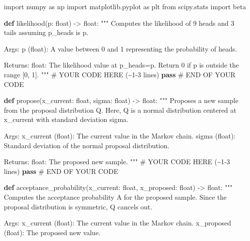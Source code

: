 \documentclass[
  letterpaper,
  numbers=noenddot,
  DIV=11,
  oneside]{scrreprt}
\newenvironment{Shaded}{\begin{snugshade}}{\end{snugshade}}
\newcommand{\BuiltInTok}[1]{\textcolor[rgb]{0.00,0.23,0.31}{#1}}
\newcommand{\CommentTok}[1]{\textcolor[rgb]{0.37,0.37,0.37}{#1}}
\newcommand{\ControlFlowTok}[1]{\textcolor[rgb]{0.00,0.23,0.31}{\textbf{#1}}}
\newcommand{\ImportTok}[1]{\textcolor[rgb]{0.00,0.46,0.62}{#1}}
\newcommand{\KeywordTok}[1]{\textcolor[rgb]{0.00,0.23,0.31}{\textbf{#1}}}
\newcommand{\NormalTok}[1]{\textcolor[rgb]{0.00,0.23,0.31}{#1}}
\newcommand{\OperatorTok}[1]{\textcolor[rgb]{0.37,0.37,0.37}{#1}}
\newcommand{\RegionMarkerTok}[1]{\textcolor[rgb]{0.00,0.23,0.31}{#1}}
\theoremstyle{remark}
\begin{document}
\begin{Shaded}
\begin{Highlighting}[numbers=left,,]
\ImportTok{import}\NormalTok{ numpy }\ImportTok{as}\NormalTok{ np}
\ImportTok{import}\NormalTok{ matplotlib.pyplot }\ImportTok{as}\NormalTok{ plt}
\ImportTok{from}\NormalTok{ scipy.stats }\ImportTok{import}\NormalTok{ beta}

\KeywordTok{def}\NormalTok{ likelihood(p: }\BuiltInTok{float}\NormalTok{) }\OperatorTok{{-}\textgreater{}} \BuiltInTok{float}\NormalTok{:}
    \CommentTok{"""}
\CommentTok{    Computes the likelihood of 9 heads and 3 tails assuming p\_heads is p.}

\CommentTok{    Args:}
\CommentTok{    p (float): A value between 0 and 1 representing the probability of heads.}

\CommentTok{    Returns:}
\CommentTok{    float: The likelihood value at p\_heads=p. Return 0 if p is outside the range [0, 1].}
\CommentTok{    """}
    \CommentTok{\# YOUR CODE HERE (\textasciitilde{}1{-}3 lines)}
    \ControlFlowTok{pass}
    \CommentTok{\# }\RegionMarkerTok{END}\CommentTok{ OF YOUR CODE}


\KeywordTok{def}\NormalTok{ propose(x\_current: }\BuiltInTok{float}\NormalTok{, sigma: }\BuiltInTok{float}\NormalTok{) }\OperatorTok{{-}\textgreater{}} \BuiltInTok{float}\NormalTok{:}
    \CommentTok{"""}
\CommentTok{    Proposes a new sample from the proposal distribution Q.}
\CommentTok{    Here, Q is a normal distribution centered at x\_current with standard deviation sigma.}

\CommentTok{    Args:}
\CommentTok{    x\_current (float): The current value in the Markov chain.}
\CommentTok{    sigma (float): Standard deviation of the normal proposal distribution.}

\CommentTok{    Returns:}
\CommentTok{    float: The proposed new sample.}
\CommentTok{    """}
    \CommentTok{\# YOUR CODE HERE (\textasciitilde{}1{-}3 lines)}
    \ControlFlowTok{pass}
    \CommentTok{\# }\RegionMarkerTok{END}\CommentTok{ OF YOUR CODE}


\KeywordTok{def}\NormalTok{ acceptance\_probability(x\_current: }\BuiltInTok{float}\NormalTok{, x\_proposed: }\BuiltInTok{float}\NormalTok{) }\OperatorTok{{-}\textgreater{}} \BuiltInTok{float}\NormalTok{:}
    \CommentTok{"""}
\CommentTok{    Computes the acceptance probability A for the proposed sample.}
\CommentTok{    Since the proposal distribution is symmetric, Q cancels out.}

\CommentTok{    Args:}
\CommentTok{    x\_current (float): The current value in the Markov chain.}
\CommentTok{    x\_proposed (float): The proposed new value.}


\end{Highlighting}
\end{Shaded}
\end{document}
